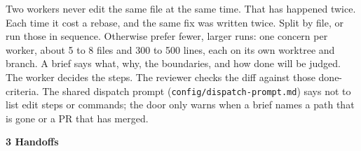 \documentclass[10pt,a4paper]{article}
\newcommand{\tcmd}[1]{{\ttfamily #1}}  %
\begin{document}
\vspace{0.45em}
\begin{center}
\end{center}

\vspace{0.25em}
{\small Two workers never edit the same file at the same time. That has happened twice. Each time it
cost a rebase, and the same fix was written twice. Split by file, or run those in sequence. Otherwise
prefer fewer, larger runs: one concern per worker, about 5 to 8 files and 300 to 500 lines, each on
its own worktree and branch. A brief says what, why, the boundaries, and how done will be judged. The
worker decides the steps. The reviewer checks the diff against those done-criteria. The shared dispatch
prompt (\texttt{config/dispatch-prompt.md}) says not to list edit steps or commands; the door only warns when a brief names a path that is gone
or a PR that has merged.}

\vspace{0.9em}
{\sffamily\bfseries\color{accent} 3 \; Handoffs}
\end{document}
